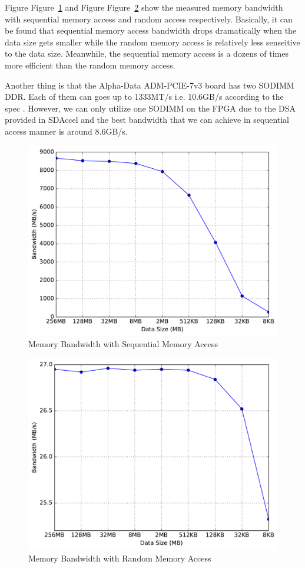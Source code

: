 \documentclass[12pt]{article} %
\newcommand{\figref}[1]{Figure~\ref{#1}}
\begin{document}
Figure \figref{fig:seq-access} and Figure \figref{fig:rnd-access} show the measured memory 
bandwidth with sequential memory access and random access respectively. Basically, it can be 
found that sequential memory access bandwidth drops dramatically when the data size gets smaller 
while the random memory access is relatively less senseitive to the data size. Meanwhile, the sequential 
memory access is a dozens of times more efficient than the random memory access.

Another thing is that the Alpha-Data ADM-PCIE-7v3 board has two SODIMM DDR. Each of them can goes up to 
1333MT/s i.e. 10.6GB/s according to the spec \cite{adm-pcie-7v3}. However, we can only utilize one 
SODIMM on the FPGA due to the DSA provided in SDAccel and the best bandwidth that we can achieve in 
sequential access manner is around 8.6GB/s.

\begin{figure}[htb]
	\centering
	\label{fig:seq-access}
	\caption{Memory Bandwidth with Sequential Memory Access}
	\includegraphics[width=.7\linewidth]{seq_access}
\end{figure}

\begin{figure}[htb]
	\centering
	\label{fig:rnd-access}
	\caption{Memory Bandwidth with Random Memory Access}
	\includegraphics[width=.7\linewidth]{rnd_access}
\end{figure}






\end{document}
